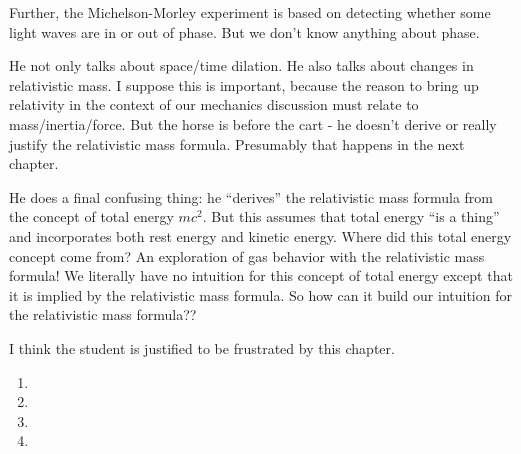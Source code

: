 Further, the Michelson-Morley experiment is based on detecting whether
some light waves are in or out of phase. But we don't know anything
about phase.

He not only talks about space/time dilation. He also talks about changes
in relativistic mass. I suppose this is important, because the reason to
bring up relativity in the context of our mechanics discussion must
relate to mass/inertia/force. But the horse is before the cart - he
doesn't derive or really justify the relativistic mass formula.
Presumably that happens in the next chapter.

He does a final confusing thing: he ``derives'' the relativistic mass
formula from the concept of total energy $mc^2$. But this assumes that
total energy ``is a thing'' and incorporates both rest energy and
kinetic energy. Where did this total energy concept come from? An
exploration of gas behavior with the relativistic mass formula! We
literally have no intuition for this concept of total energy except that
it is implied by the relativistic mass formula. So how can it build our
intuition for the relativistic mass formula??

I think the student is justified to be frustrated by this chapter.

\begin{enumerate}

  \item {}

  \item {}

  \item {}

  \item {}

\end{enumerate}
